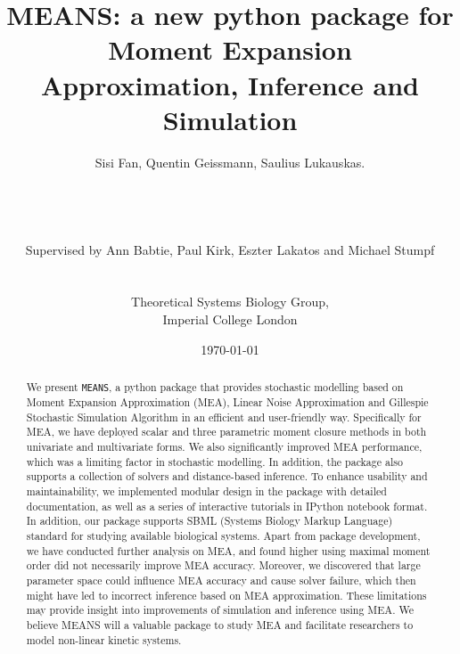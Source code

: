 \documentclass[11pt,a4paper]{article}
\newcommand{\means}{\texttt{MEANS}}
\begin{document}
\listoftodos
\newpage

\title{MEANS: a new python package for Moment Expansion Approximation, Inference and Simulation}
\author{Sisi Fan, Quentin Geissmann, Saulius Lukauskas.\\
\\	
\\
\\
\\
Supervised by Ann Babtie, Paul Kirk, Eszter Lakatos and Michael Stumpf\\
\\
\\
Theoretical Systems Biology Group,\\
Imperial College London
}
\date{\today}

\clearpage\maketitle
\thispagestyle{empty}
\newpage{}


\begin{abstract}
We present \means, a python package that provides stochastic modelling based on Moment Expansion Approximation (MEA), Linear Noise Approximation and Gillespie Stochastic Simulation Algorithm in an efficient and user-friendly way. Specifically for MEA, we have deployed scalar and three parametric moment closure methods in both univariate and multivariate forms. We also significantly improved MEA performance, which was a limiting factor in stochastic modelling.  In addition, the package also supports a collection of solvers and distance-based inference. To enhance usability and maintainability, we implemented modular design in the package with detailed documentation, as well as a series of interactive tutorials in IPython notebook format. In addition, our package supports SBML (Systems Biology Markup Language) standard for studying available biological systems. Apart from package development, we have conducted further analysis on MEA, and found higher using maximal moment order did not necessarily improve MEA accuracy. Moreover, we discovered that large parameter space could influence MEA accuracy and cause solver failure, which then might have led to incorrect inference based on MEA approximation. These limitations may provide insight into improvements of simulation and inference using MEA. We believe MEANS will a valuable package to study MEA and facilitate researchers to model non-linear kinetic systems. 
\end{abstract}
\end{document}
